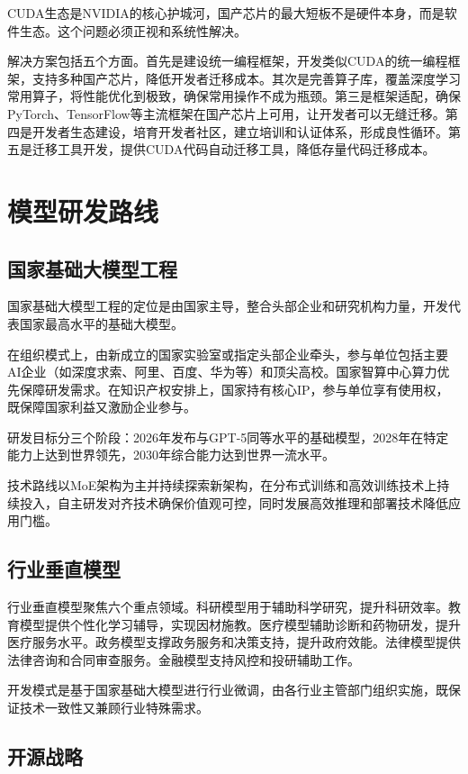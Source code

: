 CUDA生态是NVIDIA的核心护城河，国产芯片的最大短板不是硬件本身，而是软件生态。这个问题必须正视和系统性解决。

解决方案包括五个方面。首先是建设统一编程框架，开发类似CUDA的统一编程框架，支持多种国产芯片，降低开发者迁移成本。其次是完善算子库，覆盖深度学习常用算子，将性能优化到极致，确保常用操作不成为瓶颈。第三是框架适配，确保PyTorch、TensorFlow等主流框架在国产芯片上可用，让开发者可以无缝迁移。第四是开发者生态建设，培育开发者社区，建立培训和认证体系，形成良性循环。第五是迁移工具开发，提供CUDA代码自动迁移工具，降低存量代码迁移成本。

\section{模型研发路线}

\subsection{国家基础大模型工程}

国家基础大模型工程的定位是由国家主导，整合头部企业和研究机构力量，开发代表国家最高水平的基础大模型。

在组织模式上，由新成立的国家实验室或指定头部企业牵头，参与单位包括主要AI企业（如深度求索、阿里、百度、华为等）和顶尖高校。国家智算中心算力优先保障研发需求。在知识产权安排上，国家持有核心IP，参与单位享有使用权，既保障国家利益又激励企业参与。

研发目标分三个阶段：2026年发布与GPT-5同等水平的基础模型，2028年在特定能力上达到世界领先，2030年综合能力达到世界一流水平。

技术路线以MoE架构为主并持续探索新架构，在分布式训练和高效训练技术上持续投入，自主研发对齐技术确保价值观可控，同时发展高效推理和部署技术降低应用门槛。

\subsection{行业垂直模型}

行业垂直模型聚焦六个重点领域。科研模型用于辅助科学研究，提升科研效率。教育模型提供个性化学习辅导，实现因材施教。医疗模型辅助诊断和药物研发，提升医疗服务水平。政务模型支撑政务服务和决策支持，提升政府效能。法律模型提供法律咨询和合同审查服务。金融模型支持风控和投研辅助工作。

开发模式是基于国家基础大模型进行行业微调，由各行业主管部门组织实施，既保证技术一致性又兼顾行业特殊需求。

\subsection{开源战略}

